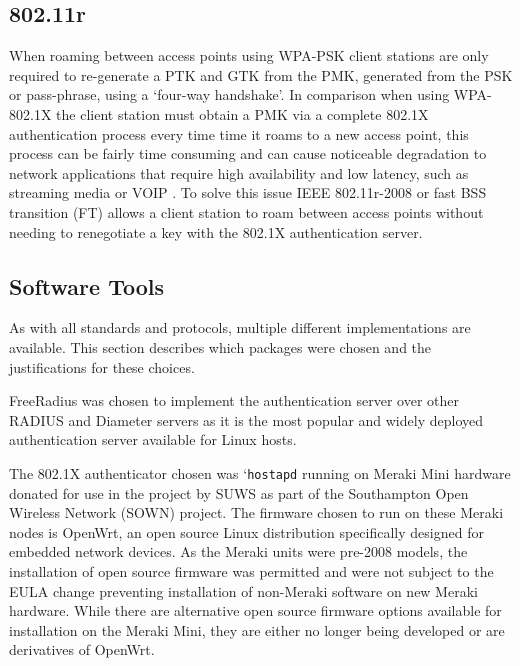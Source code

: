 \documentclass[pdftex, 12pt, a4paper]{article}
\begin{document}
\subsection{802.11r}
When roaming between access points using WPA-PSK client stations are only required to re-generate a PTK and GTK from the PMK, generated from the PSK or pass-phrase, using a `four-way handshake'\cite{IEEE80211i-2004}.  In comparison when using WPA-802.1X the client station must obtain a PMK via a complete 802.1X authentication process every time time it roams to a new access point, this process can be fairly time consuming and can cause noticeable degradation to network applications that require high availability and low latency, such as streaming media or VOIP \cite{voip-time}.  To solve this issue IEEE 802.11r-2008 or fast BSS transition (FT) allows a client station to roam between access points without needing to renegotiate a key with the 802.1X authentication server\cite{IEEE80211r-2008}.


\subsection{Software Tools}
As with all standards and protocols, multiple different implementations are available.  This section describes which packages were chosen and the justifications for these choices.

FreeRadius was chosen to implement the authentication server over other RADIUS and Diameter servers as it is the most popular and widely deployed authentication server available for Linux hosts.

The 802.1X authenticator chosen was `\verb`hostapd` running on Meraki Mini hardware donated for use in the project by SUWS as part of the Southampton Open Wireless Network (SOWN) project.  The firmware chosen to run on these Meraki nodes is OpenWrt, an open source Linux distribution specifically designed for embedded network devices. As the Meraki units were pre-2008 models, the installation of open source firmware was permitted and were not subject to the EULA change preventing installation of non-Meraki software on new Meraki hardware. While there are alternative open source firmware options available for installation on the Meraki Mini, they are either no longer being developed or are derivatives of OpenWrt\cite{meraki-eula}.
\end{document}
